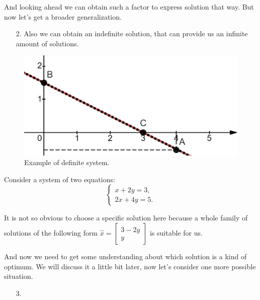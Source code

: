     And looking ahead we can obtain such a factor to express solution that way. But now let's get a broader generalization.
    \begin{itemize}
        \item[2. ] Also we can obtain an indefinite solution, that can provide us an infinite amount of solutions.
    \end{itemize}

    \begin{figure}
        \includegraphics[height=0.235\columnwidth, width=0.5\columnwidth]{lectures/images/indefinite_system.png}
        \caption*{\scriptsize{Example of definite system.}}
        \label{fig:indefinite_system_1}
    \end{figure}
    Consider a system of two equations:
    \[
        \left\{
            \begin{array}{l}
                x+2y=3,\\
                2x+4y = 5.
            \end{array}
        \right.  
    \]

    It is not so obvious to choose a specific solution here because a whole family of solutions of the following form $\hat{x} = \begin{bmatrix}
        3-2y\\y
    \end{bmatrix}$ is suitable for us. 
    \par 
    And now we need to get some understanding about which solution is a kind of optimum. We will discuss it a little bit later, now let's consider one more possible situation.
    \begin{itemize}
        \item[3. ] 
    \end{itemize}

